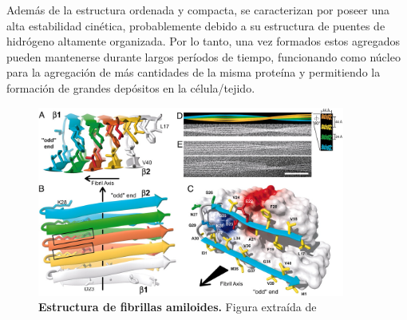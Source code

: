 Además de la estructura ordenada y compacta, se caracterizan por poseer una alta estabilidad cinética, probablemente debido a su estructura de puentes de hidrógeno altamente organizada.
Por lo tanto, una vez formados estos agregados pueden mantenerse durante largos períodos de tiempo, funcionando como núcleo para la agregación de más cantidades de la misma proteína 
y permitiendo la formación de grandes depósitos en la célula/tejido.


\begin{figure}[ht]
\centering
\includegraphics[width=0.9\textwidth]{img/amyloidStructure.jpg} 
\caption{\textbf{Estructura de fibrillas amiloides.} Figura extraída de \cite{luhrs20053d}}
\label{amyloidStructure}
\end{figure}



